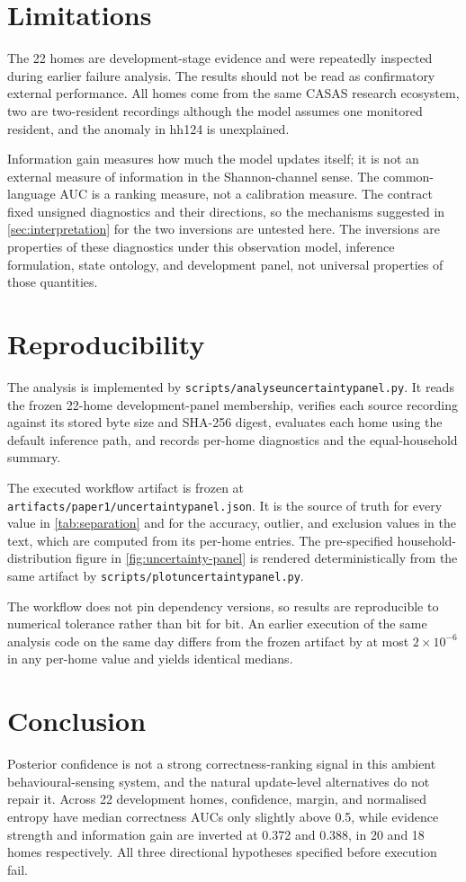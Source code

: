 \documentclass[11pt]{article}
\renewcommand{\_}{\textunderscore\allowbreak}
\begin{document}
\section{Limitations}
The 22 homes are development-stage evidence and were repeatedly inspected during earlier failure analysis. The results should not be read as confirmatory external performance. All homes come from the same CASAS research ecosystem, two are two-resident recordings although the model assumes one monitored resident, and the anomaly in hh124 is unexplained.

Information gain measures how much the model updates itself; it is not an external measure of information in the Shannon-channel sense. The common-language AUC is a ranking measure, not a calibration measure. The contract fixed unsigned diagnostics and their directions, so the mechanisms suggested in \cref{sec:interpretation} for the two inversions are untested here. The inversions are properties of these diagnostics under this observation model, inference formulation, state ontology, and development panel, not universal properties of those quantities.

\section{Reproducibility}
The analysis is implemented by \texttt{scripts/analyse\_uncertainty\_panel.py}. It reads the frozen 22-home development-panel membership, verifies each source recording against its stored byte size and SHA-256 digest, evaluates each home using the default inference path, and records per-home diagnostics and the equal-household summary.

The executed workflow artifact is frozen at \texttt{artifacts/paper1/uncertainty\_panel.json}. It is the source of truth for every value in \cref{tab:separation} and for the accuracy, outlier, and exclusion values in the text, which are computed from its per-home entries. The pre-specified household-distribution figure in \cref{fig:uncertainty-panel} is rendered deterministically from the same artifact by \texttt{scripts/plot\_uncertainty\_panel.py}.

The workflow does not pin dependency versions, so results are reproducible to numerical tolerance rather than bit for bit. An earlier execution of the same analysis code on the same day differs from the frozen artifact by at most $2\times10^{-6}$ in any per-home value and yields identical medians.

\section{Conclusion}
Posterior confidence is not a strong correctness-ranking signal in this ambient behavioural-sensing system, and the natural update-level alternatives do not repair it. Across 22 development homes, confidence, margin, and normalised entropy have median correctness AUCs only slightly above 0.5, while evidence strength and information gain are inverted at 0.372 and 0.388, in 20 and 18 homes respectively. All three directional hypotheses specified before execution fail.
\end{document}
